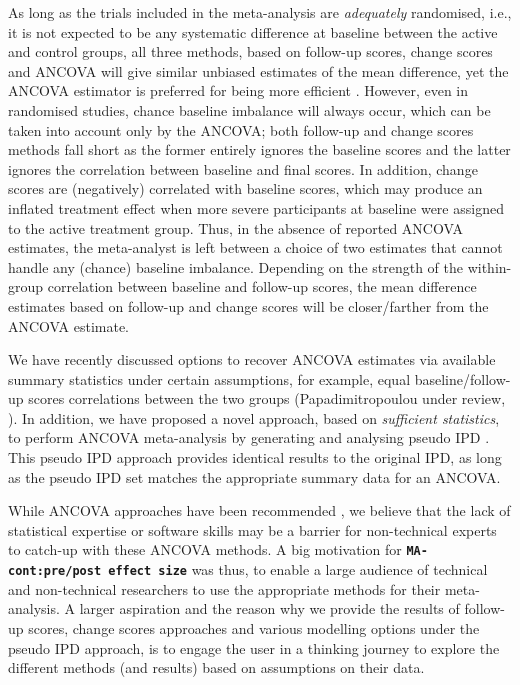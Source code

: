 \documentclass[AMA,STIX1COL]{WileyNJD-v2}
\begin{document}
As long as the trials included in the meta-analysis are \textit{adequately} randomised, {\color{blue}i.e., it is not expected to be any systematic difference at baseline between the active and control groups}, all three methods, based on follow-up scores, change scores and ANCOVA will give similar unbiased estimates of the mean difference, yet the ANCOVA estimator is preferred for being more efficient \citep{senn2006change, fu2013handling, senn2013seven, senn2014baseline}. However, even in randomised studies, chance baseline imbalance will always occur, which can be taken into account only by the ANCOVA; both follow-up and change scores methods fall short as the former entirely ignores the baseline scores and {\color{blue} the latter ignores the correlation between baseline and final scores. In addition, change scores are (negatively) correlated with baseline scores, which may produce an inflated treatment effect when more severe participants at baseline were assigned to the active treatment group\citep{vickers2001analysing}}. Thus, in the absence of reported ANCOVA estimates, the meta-analyst is left between a choice of two estimates that cannot handle any (chance) baseline imbalance. Depending on the strength of the within-group correlation between baseline and follow-up scores, the mean difference estimates based on follow-up and change scores will be closer/farther from the ANCOVA estimate.

We have recently discussed options to recover ANCOVA estimates via available summary statistics under certain assumptions, {\color{blue} for example, equal baseline/follow-up scores correlations between the two groups} (Papadimitropoulou under review, \cite{senn2006change, mckenzie2016impact}). In addition, we have proposed a novel approach, based on \textit{sufficient statistics}, to perform ANCOVA meta-analysis by generating and analysing pseudo IPD \citep{papadimitropoulou2020meta}. This pseudo IPD approach provides identical results to the original IPD, as long as the pseudo IPD set matches the appropriate summary data for an ANCOVA.

While ANCOVA approaches have been recommended \citep{fu2013handling, daly2021nice}, we believe that the lack of statistical expertise or software skills may be a barrier for non-technical experts to catch-up with these ANCOVA methods. A big motivation for \textbf{\texttt{MA-cont:pre/post effect size}} was thus, to enable a large audience of technical and non-technical researchers to use the appropriate methods for their meta-analysis. A larger aspiration and the reason why we provide the results of follow-up scores, change scores approaches and various modelling options under the pseudo IPD approach, is to engage the user in a thinking journey to explore the different methods (and results) based on assumptions on their data.
\end{document}
